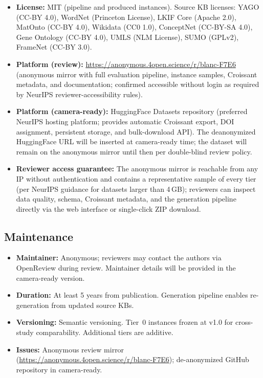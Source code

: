 \documentclass{article}
\theoremstyle{definition}
\begin{document}
\begin{itemize}[nosep]
\item \textbf{License:} MIT (pipeline and produced instances). Source KB licenses: YAGO (CC-BY 4.0), WordNet (Princeton License), LKIF Core (Apache 2.0), MatOnto (CC-BY 4.0), Wikidata (CC0 1.0), ConceptNet (CC-BY-SA 4.0), Gene Ontology (CC-BY 4.0), UMLS (NLM License), SUMO (GPLv2), FrameNet (CC-BY 3.0).
\item \textbf{Platform (review):} \url{https://anonymous.4open.science/r/blanc-F7E6} (anonymous mirror with full evaluation pipeline, instance samples, Croissant metadata, and documentation; confirmed accessible without login as required by NeurIPS reviewer-accessibility rules).
\item \textbf{Platform (camera-ready):} HuggingFace Datasets repository (preferred NeurIPS hosting platform; provides automatic Croissant export, DOI assignment, persistent storage, and bulk-download API). The deanonymized HuggingFace URL will be inserted at camera-ready time; the dataset will remain on the anonymous mirror until then per double-blind review policy.
\item \textbf{Reviewer access guarantee:} The anonymous mirror is reachable from any IP without authentication and contains a representative sample of every tier (per NeurIPS guidance for datasets larger than 4\,GB); reviewers can inspect data quality, schema, Croissant metadata, and the generation pipeline directly via the web interface or single-click ZIP download.
\end{itemize}

\subsection*{Maintenance}

\begin{itemize}[nosep]
\item \textbf{Maintainer:} Anonymous; reviewers may contact the authors via OpenReview during review. Maintainer details will be provided in the camera-ready version.
\item \textbf{Duration:} At least 5 years from publication. Generation pipeline enables re-generation from updated source KBs.
\item \textbf{Versioning:} Semantic versioning. Tier~0 instances frozen at v1.0 for cross-study comparability. Additional tiers are additive.
\item \textbf{Issues:} Anonymous review mirror (\url{https://anonymous.4open.science/r/blanc-F7E6}); de-anonymized GitHub repository in camera-ready.
\end{itemize}
\end{document}
